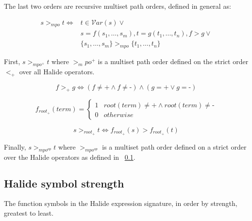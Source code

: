 \documentclass[sigplan,10pt,review,anonymous]{acmart}\settopmatter{printfolios=true,printccs=false,printacmref=false}
\begin{document}
The last two orders are recursive multiset path orders, defined in general as:

\begin{equation}
\begin{split}
s >_{mpo} t \iff & t \in \mathcal{V}ar(s) \vee \\
              &  s = f(s_1,\dots,s_m), t = g(t_1,...,t_n), f > g \vee \\
               & \{s_1, \dots, s_m\} >_{mpo} \{t_1,\dots,t_n\}
\end{split}
\end{equation}

First, $s >_{mpo^+} t$ where $>_mpo^+$ is a multiset path order defined on the strict order $<_+$ over all Halide operators.

\begin{equation}
f >_+ g \iff (f \neq \texttt{+} \wedge f \neq \texttt{-}) \wedge (g = \texttt{+} \vee g = \texttt{-})
\end{equation}

\[
f_{root_{\texttt{+}}}(term) = \begin{cases}
                          1 & root(term) \neq \texttt{+} \wedge root(term) \neq \texttt{-} \\
                          0 & otherwise
                          \end{cases}
\]

\begin{equation}
s >_{root_{\texttt{+}}} t \iff f_{root_{\texttt{+}}}(s) > f_{root_{\texttt{+}}}(t)
\end{equation}

Finally, $s >_{mpo^{op}} t$ where $>_{mpo^{op}}$ is a multiset path order defined on a strict order over the Halide operators as defined in ~\ref{symbolstrength}.

\subsection{Halide symbol strength} \label{symbolstrength}

The function symbols in the Halide expression signature, in order by strength, greatest to least.
\end{document}
